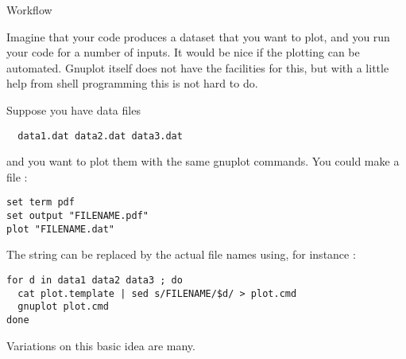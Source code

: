  {Workflow}

Imagine that your code produces a dataset that you want to plot, and
you run your code for a number of inputs. It would be nice if the
plotting can be automated. Gnuplot itself does not have the facilities
for this, but with a little help from shell programming this is not
hard to do.

Suppose you have data files
\begin{verbatim}
  data1.dat data2.dat data3.dat
\end{verbatim}
and you want to plot them with the same gnuplot commands. You could
make a file :
\begin{verbatim}
set term pdf
set output "FILENAME.pdf"
plot "FILENAME.dat"
\end{verbatim}
The string  can be replaced by the actual file names
using, for instance :
\begin{verbatim}
for d in data1 data2 data3 ; do
  cat plot.template | sed s/FILENAME/$d/ > plot.cmd
  gnuplot plot.cmd
done
\end{verbatim}
Variations on this basic idea are many.
